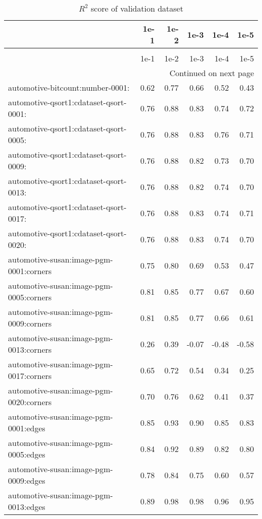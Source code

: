 \begin{longtable}{lrrrrr}
\caption{$R^2$ score of validation dataset} \label{table:validate-score} \\
\toprule
 & 1e-1 & 1e-2 & 1e-3 & 1e-4 & 1e-5 \\
\midrule
\endfirsthead
\caption[]{$R^2$ score of validation dataset} \\
\toprule
 & 1e-1 & 1e-2 & 1e-3 & 1e-4 & 1e-5 \\
\midrule
\endhead
\midrule
\multicolumn{6}{r}{Continued on next page} \\
\midrule
\endfoot
\bottomrule
\endlastfoot
automotive-bitcount:number-0001: & 0.62 & 0.77 & 0.66 & 0.52 & 0.43 \\
automotive-qsort1:cdataset-qsort-0001: & 0.76 & 0.88 & 0.83 & 0.74 & 0.72 \\
automotive-qsort1:cdataset-qsort-0005: & 0.76 & 0.88 & 0.83 & 0.76 & 0.71 \\
automotive-qsort1:cdataset-qsort-0009: & 0.76 & 0.88 & 0.82 & 0.73 & 0.70 \\
automotive-qsort1:cdataset-qsort-0013: & 0.76 & 0.88 & 0.82 & 0.74 & 0.70 \\
automotive-qsort1:cdataset-qsort-0017: & 0.76 & 0.88 & 0.83 & 0.74 & 0.71 \\
automotive-qsort1:cdataset-qsort-0020: & 0.76 & 0.88 & 0.83 & 0.74 & 0.70 \\
automotive-susan:image-pgm-0001:corners & 0.75 & 0.80 & 0.69 & 0.53 & 0.47 \\
automotive-susan:image-pgm-0005:corners & 0.81 & 0.85 & 0.77 & 0.67 & 0.60 \\
automotive-susan:image-pgm-0009:corners & 0.81 & 0.85 & 0.77 & 0.66 & 0.61 \\
automotive-susan:image-pgm-0013:corners & 0.26 & 0.39 & -0.07 & -0.48 & -0.58 \\
automotive-susan:image-pgm-0017:corners & 0.65 & 0.72 & 0.54 & 0.34 & 0.25 \\
automotive-susan:image-pgm-0020:corners & 0.70 & 0.76 & 0.62 & 0.41 & 0.37 \\
automotive-susan:image-pgm-0001:edges & 0.85 & 0.93 & 0.90 & 0.85 & 0.83 \\
automotive-susan:image-pgm-0005:edges & 0.84 & 0.92 & 0.89 & 0.82 & 0.80 \\
automotive-susan:image-pgm-0009:edges & 0.78 & 0.84 & 0.75 & 0.60 & 0.57 \\
automotive-susan:image-pgm-0013:edges & 0.89 & 0.98 & 0.98 & 0.96 & 0.95 \\

\end{longtable}
